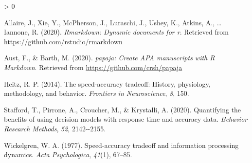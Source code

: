 \documentclass[
  english,
  ,jou,floatsintext]{apa6}
\newlength{\cslhangindent}
\newenvironment{CSLReferences}[2] %
 {%
  \setlength{\parindent}{0pt}
  \ifodd #1 \everypar{\setlength{\hangindent}{\cslhangindent}}\ignorespaces\fi
  \ifnum #2 > 0
  \setlength{\parskip}{#2\baselineskip}
  \fi
 }%
 {}
\begin{document}
\hypertarget{refs}{}
\begin{CSLReferences}{1}{0}
\leavevmode\hypertarget{ref-rmarkdowncite}{}%
Allaire, J., Xie, Y., McPherson, J., Luraschi, J., Ushey, K., Atkins, A., \ldots{} Iannone, R. (2020). \emph{Rmarkdown: Dynamic documents for r}. Retrieved from \url{https://github.com/rstudio/rmarkdown}

\leavevmode\hypertarget{ref-aust2020}{}%
Aust, F., \& Barth, M. (2020). \emph{{papaja}: {Create} {APA} manuscripts with {R Markdown}}. Retrieved from \url{https://github.com/crsh/papaja}

\leavevmode\hypertarget{ref-heitz2014speed}{}%
Heitz, R. P. (2014). The speed-accuracy tradeoff: History, physiology, methodology, and behavior. \emph{Frontiers in Neuroscience}, \emph{8}, 150.

\leavevmode\hypertarget{ref-stafford2020}{}%
Stafford, T., Pirrone, A., Croucher, M., \& Krystalli, A. (2020). Quantifying the benefits of using decision models with response time and accuracy data. \emph{Behavior Research Methods}, \emph{52}, 2142-\/-2155.

\leavevmode\hypertarget{ref-wickelgren1977speed}{}%
Wickelgren, W. A. (1977). Speed-accuracy tradeoff and information processing dynamics. \emph{Acta Psychologica}, \emph{41}(1), 67--85.

\end{CSLReferences}
\end{document}
